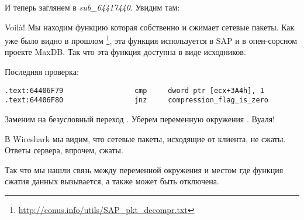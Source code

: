 И теперь заглянем в \emph{sub\_64417440}. Увидим там:



Voilà! Мы находим функцию которая собственно и сжимает сетевые пакеты.
Как уже было видно в прошлом
\footnote{\url{http://conus.info/utils/SAP_pkt_decompr.txt}},
эта функция используется в SAP и в опен-сорсном проекте MaxDB.
Так что эта функция доступна в виде исходников.

Последняя проверка:

\begin{lstlisting}[style=customasmx86]
.text:64406F79                 cmp     dword ptr [ecx+3A4h], 1
.text:64406F80                 jnz     compression_flag_is_zero
\end{lstlisting}

Заменим \JNZ на безусловный переход \JMP. Уберем переменную окружения \TDWNC. Вуаля!

В Wireshark мы видим, что сетевые пакеты, исходящие от клиента, не сжаты. Ответы сервера, впрочем, сжаты.

Так что мы нашли связь между переменной окружения и местом где функция сжатия данных вызывается, а также
может быть отключена.


